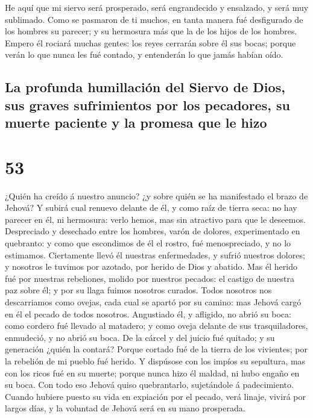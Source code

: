  He aquí que mi siervo será prosperado, será engrandecido
y ensalzado, y será muy sublimado.  Como se pasmaron de
ti muchos, en tanta manera fué desfigurado de los hombres su parecer; y
su hermosura más que la de los hijos de los hombres. 
Empero él rociará muchas gentes: los reyes cerrarán sobre él sus bocas;
porque verán lo que nunca les fué contado, y entenderán lo que jamás
habían oído.

\hypertarget{la-profunda-humillaciuxf3n-del-siervo-de-dios-sus-graves-sufrimientos-por-los-pecadores-su-muerte-paciente-y-la-promesa-que-le-hizo}{%
\subsection{La profunda humillación del Siervo de Dios, sus graves
sufrimientos por los pecadores, su muerte paciente y la promesa que le
hizo}\label{la-profunda-humillaciuxf3n-del-siervo-de-dios-sus-graves-sufrimientos-por-los-pecadores-su-muerte-paciente-y-la-promesa-que-le-hizo}}

\hypertarget{section-52}{%
\section{53}\label{section-52}}

 ¿Quién ha creído á nuestro anuncio? ¿y sobre quién se ha
manifestado el brazo de Jehová?  Y subirá cual renuevo
delante de él, y como raíz de tierra seca: no hay parecer en él, ni
hermosura: verlo hemos, mas sin atractivo para que le deseemos.
 Despreciado y desechado entre los hombres, varón de
dolores, experimentado en quebranto: y como que escondimos de él el
rostro, fué menospreciado, y no lo estimamos.  Ciertamente
llevó él nuestras enfermedades, y sufrió nuestros dolores; y nosotros le
tuvimos por azotado, por herido de Dios y abatido.  Mas él
herido fué por nuestras rebeliones, molido por nuestros pecados: el
castigo de nuestra paz sobre él; y por su llaga fuimos nosotros curados.
 Todos nosotros nos descarriamos como ovejas, cada cual se
apartó por su camino: mas Jehová cargó en él el pecado de todos
nosotros.  Angustiado él, y afligido, no abrió su boca:
como cordero fué llevado al matadero; y como oveja delante de sus
trasquiladores, enmudeció, y no abrió su boca.  De la
cárcel y del juicio fué quitado; y su generación ¿quién la contará?
Porque cortado fué de la tierra de los vivientes; por la rebelión de mi
pueblo fué herido.  Y dispúsose con los impíos su
sepultura, mas con los ricos fué en su muerte; porque nunca hizo él
maldad, ni hubo engaño en su boca.  Con todo eso Jehová
quiso quebrantarlo, sujetándole á padecimiento. Cuando hubiere puesto su
vida en expiación por el pecado, verá linaje, vivirá por largos días, y
la voluntad de Jehová será en su mano prosperada.

